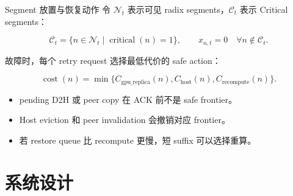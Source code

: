 \documentclass[aspectratio=43]{beamer}
\newcommand{\tightitems}{\setlength{\itemsep}{2pt}\setlength{\parskip}{0pt}}
\newcommand{\Critical}{Critical}
\begin{document}
\begin{frame}{Segment 放置与恢复动作}
  \small
  令 $\mathcal{N}_t$ 表示可见 radix segments，$\mathcal{C}_t$ 表示 \Critical{} segments：

  \vspace{0.05cm}
  \[
    \mathcal{C}_t =
    \{ n\in\mathcal{N}_t \mid \operatorname{critical}(n)=1 \},
    \qquad
    x_{n,t}=0\quad\forall n\notin\mathcal{C}_t .
  \]

  \vspace{0.08cm}
  故障时，每个 retry request 选择最低代价的 safe action：

  \vspace{0.05cm}
  \[
    \operatorname{cost}(n) =
    \min\{
      C_{\mathrm{gpu\_replica}}(n),
      C_{\mathrm{host}}(n),
      C_{\mathrm{recompute}}(n)
    \}.
  \]

  \vspace{0.08cm}
  \begin{itemize}
    \tightitems
    \item pending D2H 或 peer copy 在 ACK 前不是 safe frontier。
    \item Host eviction 和 peer invalidation 会撤销对应 frontier。
    \item 若 restore queue 比 recompute 更慢，短 suffix 可以选择重算。
  \end{itemize}
\end{frame}

\section{系统设计}
\end{document}
